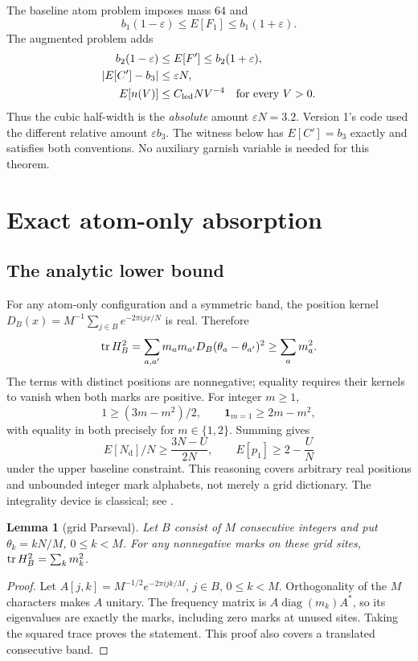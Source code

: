 \documentclass[11pt]{article}
\newtheorem{lemma}[theorem]{Lemma}
\theoremstyle{definition}\newtheorem{definition}[theorem]{Definition}
\theoremstyle{remark}\newtheorem{remark}[theorem]{Remark}
\newcommand{\Nd}{N_{\mathrm d}}\newcommand{\one}{\mathbf 1}
\begin{document}
The baseline atom problem imposes mass $64$ and
\begin{equation}\label{eq:base}
 b_1(1-\varepsilon)\le E[F_1]\le b_1(1+\varepsilon).
\end{equation}
The augmented problem adds
\begin{align}
 b_2(1-\varepsilon)&\le E[F']\le b_2(1+\varepsilon),\label{eq:fp}\\
 |E[C']-b_3|&\le\varepsilon N,\label{eq:cp}\\
 E[n(V)]&\le C_{\mathrm{led}}N V^{-4}\quad\hbox{for every }V>0.\label{eq:ladder}
\end{align}
Thus the cubic half-width is the \emph{absolute} amount $\varepsilon N=3.2$.
Version 1's code used the different relative amount $\varepsilon b_3$.
The witness below has $E[C']=b_3$ exactly and satisfies both conventions.
No auxiliary garnish variable is needed for this theorem.

\section{Exact atom-only absorption}\label{sec:main}
\subsection{The analytic lower bound}
For any atom-only configuration and a symmetric band, the position kernel
$D_B(x)=M^{-1}\sum_{j\in B}e^{-2\pi ijx/N}$ is real. Therefore
\[
 \operatorname{tr} H_B^2=\sum_{a,a'}m_am_{a'}D_B(\theta_a-\theta_{a'})^2
       \ge\sum_a m_a^2.
\]
The terms with distinct positions are nonnegative; equality requires their
kernels to vanish when both marks are positive. For integer $m\ge1$,
\[
 1\ge(3m-m^2)/2,\qquad \one_{m=1}\ge2m-m^2,
\]
with equality in both precisely for $m\in\{1,2\}$. Summing gives
\begin{equation}\label{eq:corners}
 E[\Nd]/N\ge\frac{3N-U}{2N},\qquad
 E[p_1]\ge2-\frac{U}{N}
\end{equation}
under the upper baseline constraint. This reasoning covers arbitrary real
positions and unbounded integer mark alphabets, not merely a grid dictionary.
The integrality device is classical; see \cite{CGG98}.

\begin{lemma}[grid Parseval]\label{lem:grid}
Let $B$ consist of $M$ consecutive integers and put $\theta_k=kN/M$,
$0\le k<M$. For any nonnegative marks on these grid sites,
$\operatorname{tr} H_B^2=\sum_k m_k^2$.
\end{lemma}
\begin{proof}
Let $A[j,k]=M^{-1/2}e^{-2\pi ijk/M}$, $j\in B$, $0\le k<M$.
Orthogonality of the $M$ characters makes $A$ unitary. The frequency
matrix is $A\operatorname{diag}(m_k)A^*$, so its eigenvalues are exactly
the marks, including zero marks at unused sites. Taking the squared trace
proves the statement. This proof also covers a translated consecutive band.
\end{proof}
\end{document}
